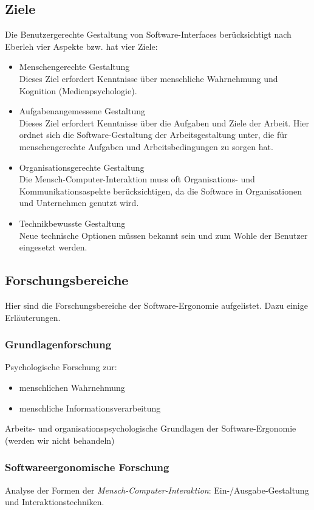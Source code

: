 \subsection{Ziele}
Die Benutzergerechte Gestaltung von Software-Interfaces berücksichtigt nach Eberleh  vier Aspekte bzw. hat vier Ziele:
\begin{itemize}
\item Menschengerechte Gestaltung\\
Dieses Ziel erfordert Kenntnisse über menschliche Wahrnehmung und Kognition (Medienpsychologie). 
\item Aufgabenangemessene Gestaltung\\
Dieses Ziel erfordert Kenntnisse über die Aufgaben und Ziele der Arbeit. 
Hier ordnet sich die Software-Gestaltung der Arbeitsgestaltung unter, die für menschengerechte Aufgaben und Arbeitsbedingungen zu sorgen hat. 
\item Organisationsgerechte Gestaltung\\
Die Mensch-Computer-Interaktion muss oft Organisations- und Kommunikationsaspekte berücksichtigen, da die Software in Organisationen und Unternehmen genutzt wird. 
\item Technikbewusste Gestaltung\\
Neue technische Optionen müssen bekannt sein und zum Wohle der Benutzer eingesetzt werden.
\end{itemize}

\subsection{Forschungsbereiche}
Hier sind die Forschungsbereiche der Software-Ergonomie aufgelistet. Dazu einige Erläuterungen.

\subsubsection*{Grundlagenforschung}
Psychologische Forschung zur:
\begin{itemize}
\item menschlichen Wahrnehmung
\item menschliche Informationsverarbeitung
\end{itemize}
 
Arbeits- und organisationspsychologische Grundlagen der Software-Ergonomie (werden wir nicht behandeln)
 
\subsubsection*{Softwareergonomische Forschung}
Analyse der Formen der \emph{Mensch-Computer-Interaktion}: Ein-/Ausgabe-Gestaltung und Interaktionstechniken.

